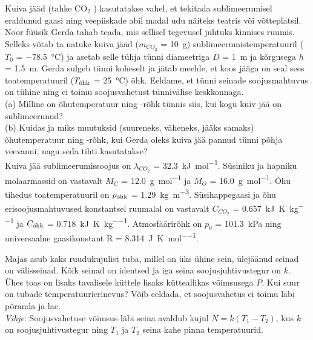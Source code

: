 \documentclass[10pt]{article}
\begin{document}

Kuiva jääd (tahke CO\(_{2}\) ) kasutatakse vahel, et tekitada sublimeerumisel eraldunud gaasi ning veepiiskade abil madal udu näiteks teatris või võtteplatsil. Noor füüsik Gerda tahab teada, mis sellisel tegevusel juhtuks kinnises ruumis. Selleks võtab ta natuke kuiva jääd (\(m_{CO_2}\) = \SI{10}{\gram}) sublimeerumistemperatuuril (\(T_{0}\) = \SI{-78,5}{\degreeCelsius}) ja asetab selle tühja tünni diameetriga \(D\) = \SI{1}{\meter} ja kõrgusega \(h\) = \SI{1,5}{\metre}. Gerda sulgeb tünni koheselt ja jätab meelde, et koos jääga on seal sees toatemperatuuril (\(T_{\textup{õhk}}\) = \SI{25}{\degreeCelsius}) õhk. Eeldame, et tünni seinade soojusmahtuvus on tühine ning ei toimu soojusvahetust tünnivälise keskkonnaga.
\\(a) Milline on õhutemperatuur ning -rõhk tünnis siis, kui kogu kuiv jää on sublimeerunud?
\\(b) Kuidas ja miks muutuksid (suureneks, väheneks, jääks samaks) õhutemperatuur ning -rõhk, kui Gerda oleks kuiva jää pannud tünni põhja veevanni, nagu seda tihti kasutatakse?\\
Kuiva jää sublimeerumissoojus on \(\lambda_{CO_2}\) = \SI{32,3}{\kilo\joule\per\mole}. Süsiniku ja hapniku molaarmassid on vastavalt \(M_C\) = \SI{12,0}{\gram\per\mole} ja \(M_O\) = \SI{16,0}{\gram\per\mole}. Õhu tihedus toatemperatuuril on \(\rho_{\textup{õhk}}\) = \SI{1,29}{\kilo\gram\per\metre\cubed}. Süsihappegaasi ja õhu erisoojusmahtuvused konstantsel ruumalal on vastavalt \(C_{CO_{2}}\) = \SI{0,657}{\kilo\joule\per\kelvin\per\kilo\gram} ja \(C_{\textup{õhk}}\) = \SI{0,718}{\kilo\joule\per\kelvin\per\kilo\gram}. Atmosfäärirõhk on \(p_{0}\) = \SI{101,3}{\kilo\pascal} ning universaalne gaasikonstant R = \SI{8,314}{\joule\per\kelvin\per\mole}.
\probend
\bigskip


Majas asub kaks ruudukujulist tuba, millel on üks ühine sein, ülejäänud seinad on välisseinad. Kõik seinad on identsed ja iga seina soojusjuhtivustegur on $k$. Ühes toas on lisaks tavalisele küttele lisaks kütteallikas võimsusega $P$. Kui suur on tubade temperatuurierinevus? Võib eeldada, et soojusvahetus ei toimu läbi põranda ja lae.
\\\emph{Vihje}: Soojusvahetuse võimsus läbi seina avaldub kujul $N=k(T_1-T_2)$, kus $k$ on soojusjuhtivustegur ning $T_1$ ja $T_2$ seina kahe pinna temperatuurid.
\probend
\bigskip
\end{document}
